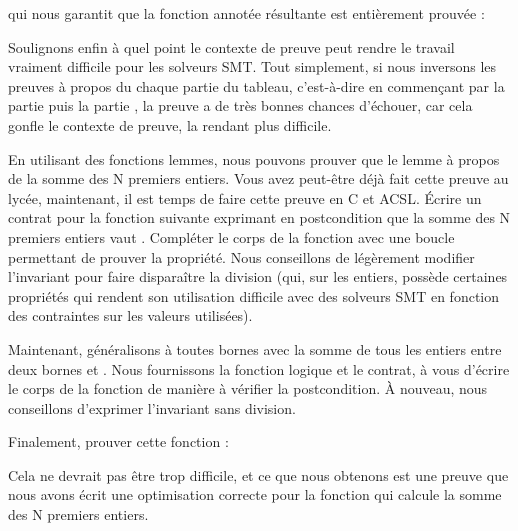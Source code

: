 

qui nous garantit que la fonction annotée résultante est entièrement prouvée :




Soulignons enfin à quel point le contexte de preuve peut rendre
le travail vraiment difficile pour les solveurs SMT. Tout simplement, si nous
inversons les preuves à propos du chaque partie du tableau, c'est-à-dire en
commençant par la partie  puis la partie ,
la preuve a de très bonnes chances d'échouer, car cela gonfle le contexte de
preuve, la rendant plus difficile.






En utilisant des fonctions lemmes, nous pouvons prouver que le lemme à
propos de la somme des N premiers entiers. Vous avez peut-être déjà fait cette
preuve au lycée, maintenant, il est temps de faire cette preuve en C et ACSL.
Écrire un contrat pour la fonction suivante exprimant en postcondition que la
somme des N premiers entiers vaut . Compléter le corps de la
fonction avec une boucle permettant de prouver la propriété. Nous conseillons de légèrement
modifier l'invariant pour faire disparaître la division (qui, sur les entiers,
possède certaines propriétés qui rendent son utilisation difficile avec des
solveurs SMT en fonction des contraintes sur les valeurs utilisées).




Maintenant, généralisons à toutes bornes avec la somme de tous les entiers entre
deux bornes  et . Nous fournissons la fonction
logique et le contrat, à vous d'écrire le corps de la fonction de manière à vérifier
la postcondition. À nouveau, nous conseillons d'exprimer l'invariant sans division.




Finalement, prouver cette fonction :




Cela ne devrait pas être trop difficile, et ce que nous obtenons est une preuve
que nous avons écrit une optimisation correcte pour la fonction qui calcule la
somme des N premiers entiers.


